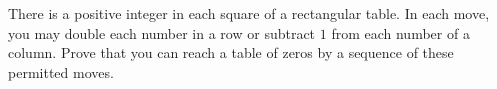 There is a positive integer in each square of a rectangular table. In each move, you may double each number in a row or subtract $1$ from each number of a column. Prove that you can reach a table of zeros by a sequence of these permitted moves.
